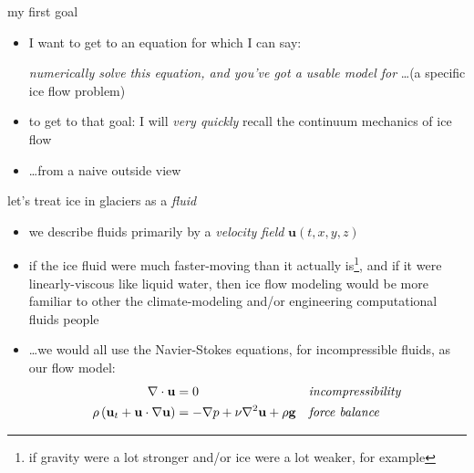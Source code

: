 \begin{frame}{my first goal}

\begin{itemize}
\item I want to get to an equation for which I can say:
\bigskip

\begin{center}
\emph{numerically solve this equation, and you've got a usable model for} \dots (a specific ice flow problem) 
\end{center}
\bigskip

\item to get to that goal: I will \emph{very quickly} recall the continuum mechanics of ice flow
\item \dots from a naive outside view
\end{itemize}
\end{frame}


\begin{frame}{let's treat ice in glaciers as a \emph{fluid}}

\begin{itemize}
\item we describe fluids primarily by a \emph{velocity field} $\mathbf{u}(t,x,y,z)$
\item if the ice fluid were much faster-moving than it actually is\footnote{if gravity were a lot stronger and/or ice were a lot weaker, for example}, and if it were linearly-viscous like liquid water, then ice flow modeling would be more familiar to other the climate-modeling and/or engineering computational fluids people
\item \dots we would all use the Navier-Stokes equations, for incompressible fluids, as our flow model:
\begin{align*}
\nabla \cdot \mathbf{u} &= 0 &&\text{\emph{incompressibility}} \\
\rho \left(\mathbf{u}_t + \mathbf{u}\cdot\nabla \mathbf{u}\right) &= -\nabla p + \nu \nabla^2 \mathbf{u} + \rho \mathbf{g} &&\text{\emph{force balance}}
\end{align*}
\end{itemize}
\end{frame}


